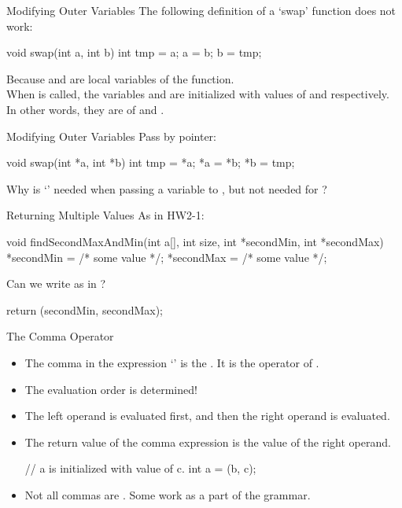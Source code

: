 \documentclass{beamer}
\begin{document}
\begin{frame}[fragile]{Modifying Outer Variables}
	The following definition of a `swap' function does not work:
	\begin{cpp}
void swap(int a, int b) {
  int tmp = a;
  a = b;
  b = tmp;
}
	\end{cpp}
	\pause
	Because  and  are local variables of the function.\\
	When  is called, the variables  and  are initialized with values of  and  respectively. In other words, they are  of  and .
\end{frame}

\begin{frame}[fragile]{Modifying Outer Variables}
	Pass by pointer:
	\begin{cpp}
void swap(int *a, int *b) {
  int tmp = *a;
  *a = *b;
  *b = tmp;
}
	\end{cpp}
	\pause
	\begin{question}
		Why is `\ttt{\&}' needed when passing a variable to , but not needed for ?
	\end{question}
\end{frame}

\begin{frame}[fragile]{Returning Multiple Values}
	As in HW2-1:
	\begin{cpp}
void findSecondMaxAndMin(int a[], int size, int *secondMin, int *secondMax) {
  *secondMin = /* some value */;
  *secondMax = /* some value */;
}
	\end{cpp}
	\pause
	Can we write as in ?
	\begin{cpp}
return (secondMin, secondMax);
	\end{cpp}
\end{frame}

\begin{frame}[fragile]{The Comma Operator}
	\begin{itemize}
		\item The comma in the expression `' is the . It is the operator of .
		\pause
		\item The evaluation order is determined! 
		\item The left operand is evaluated first, and then the right operand is evaluated.
		\item The return value of the comma expression is the value of the right operand.
		\begin{cpp}
// a is initialized with value of c.
int a = (b, c);
		\end{cpp}
		\pause
		\item Not all commas are . Some work as a part of the grammar.
	\end{itemize}
\end{frame}
\end{document}
